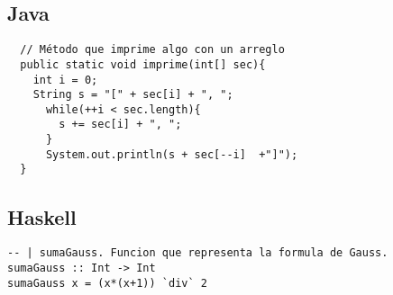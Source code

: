 \documentclass[spanish,12pt,letterpaper]{article}
\begin{document}
\subsection{Java}
\begin{verbatim}
  // Método que imprime algo con un arreglo
  public static void imprime(int[] sec){
    int i = 0;
    String s = "[" + sec[i] + ", ";
      while(++i < sec.length){
        s += sec[i] + ", ";
      }
      System.out.println(s + sec[--i]  +"]");
  }
\end{verbatim}


\subsection{Haskell}

\begin{verbatim}
-- | sumaGauss. Funcion que representa la formula de Gauss.
sumaGauss :: Int -> Int
sumaGauss x = (x*(x+1)) `div` 2
\end{verbatim}
\end{document}
